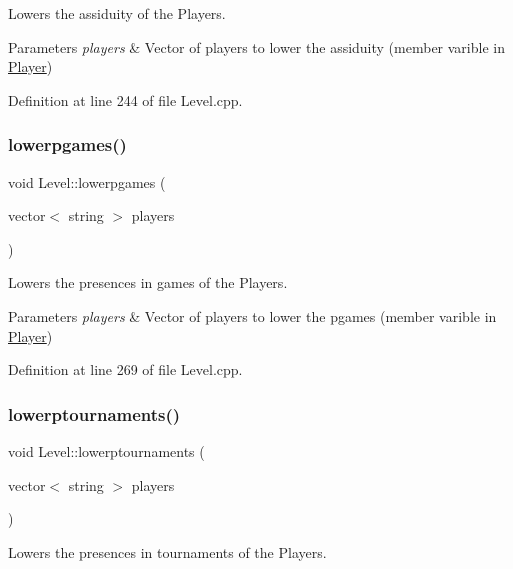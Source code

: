 Lowers the assiduity of the Players. 


\begin{DoxyParams}{Parameters}
{\em players} & Vector of players to lower the assiduity (member varible in \hyperlink{class_player}{Player}) \\
\hline
\end{DoxyParams}


Definition at line 244 of file Level.\+cpp.

\hypertarget{class_level_a336a54c2ef7e4307e9353a200a11537e}{}\label{class_level_a336a54c2ef7e4307e9353a200a11537e} 
\subsubsection{\texorpdfstring{lowerpgames()}{lowerpgames()}}
{\footnotesize\ttfamily void Level\+::lowerpgames (\begin{DoxyParamCaption}\item[{vector$<$ string $>$}]{players }\end{DoxyParamCaption})}



Lowers the presences in games of the Players. 


\begin{DoxyParams}{Parameters}
{\em players} & Vector of players to lower the pgames (member varible in \hyperlink{class_player}{Player}) \\
\hline
\end{DoxyParams}


Definition at line 269 of file Level.\+cpp.

\hypertarget{class_level_afbb999a489e4e185bb26e965939a97e5}{}\label{class_level_afbb999a489e4e185bb26e965939a97e5} 
\subsubsection{\texorpdfstring{lowerptournaments()}{lowerptournaments()}}
{\footnotesize\ttfamily void Level\+::lowerptournaments (\begin{DoxyParamCaption}\item[{vector$<$ string $>$}]{players }\end{DoxyParamCaption})}



Lowers the presences in tournaments of the Players. 


